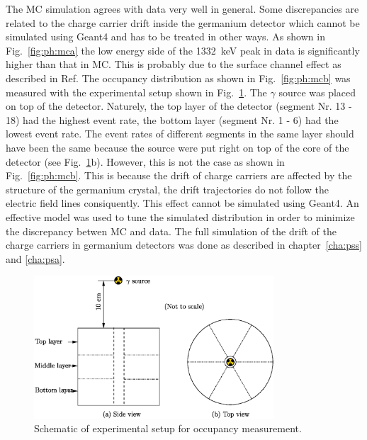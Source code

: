 The MC simulation agrees with data very well in general. Some discrepancies are related to the charge carrier drift inside the germanium detector which cannot be simulated using Geant4 and has to be treated in other ways. As shown in Fig.~\ref{fig:ph:mca} the low energy side of the 1332~keV peak in data is significantly higher than that in MC. This is probably due to the surface channel effect as described in Ref\cite{Sur05}. The occupancy distribution as shown in Fig.~\ref{fig:ph:mcb} was measured with the experimental setup shown in Fig.~\ref{fig:ph:occ}. The $\gamma$ source was placed on top of the detector. Naturely, the top layer of the detector (segment Nr. 13 - 18) had the highest event rate, the bottom layer (segment Nr. 1 - 6) had the lowest event rate. The event rates of different segments in the same layer should have been the same because the source were put right on top of the core of the detector (see Fig.~\ref{fig:ph:occ}b). However, this is not the case as shown in Fig.~\ref{fig:ph:mcb}. This is because the drift of charge carriers are affected by the structure of the germanium crystal, the drift trajectories do not follow the electric field lines consiquently. This effect cannot be simulated using Geant4. An effective model was used to tune the simulated distribution in order to minimize the discrepancy betwen MC and data. The full simulation of the drift of the charge carriers in germanium detectors was done as described in chapter~\ref{cha:pss} and \ref{cha:psa}.

\begin{figure}[htbp]
\centering
\includegraphics[width=0.8\textwidth]{occumea}
\caption{Schematic of experimental setup for occupancy measurement.}
\label{fig:ph:occ}
\end{figure}

